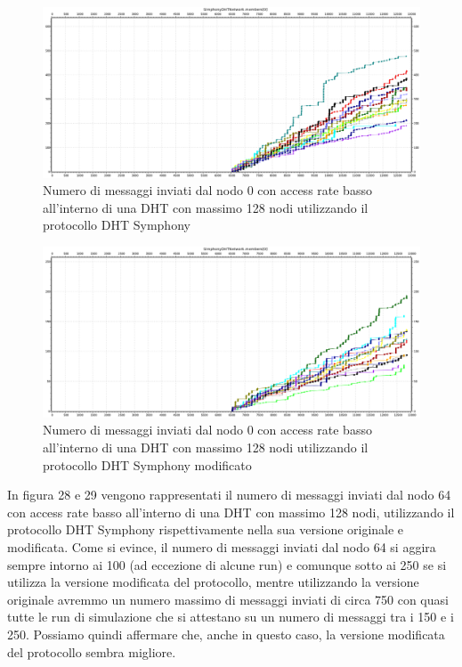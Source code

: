 \documentclass[	
	DIV=calc,
	paper=a4,
	fontsize=11pt,
	onecolumn
]{scrartcl} %
\begin{document}
	\begin{figure}[H]
		\centering
		\includegraphics[scale=0.35]	{SymphonyDHT/plots/MessagesSentByEveryNode/128_Nodes_SlowAccess/SymphonyDHT_128Nodes_SlowAccess_Node0.png}
		\caption{Numero di messaggi inviati dal nodo 0 con access rate basso all'interno di una DHT con massimo 128 nodi utilizzando il protocollo DHT Symphony}
		\label{Figura 26}
	\end{figure}
	\begin{figure}[H]
		\centering
		\includegraphics[scale=0.35]	{SymphonyDHTMod/plots/MessagesSentByEveryNode/128_Nodes_SlowAccess/SymphonyDHTMod_128Nodes_SlowAccess_Node0.png}
		\caption{Numero di messaggi inviati dal nodo 0 con access rate basso all'interno di una DHT con massimo 128 nodi utilizzando il protocollo DHT Symphony modificato}
		\label{Figura 27}
	\end{figure}
	
	In figura 28 e 29 vengono rappresentati il numero di messaggi inviati dal nodo 64 con access rate basso all'interno di una DHT con massimo 128 nodi, utilizzando il protocollo DHT Symphony rispettivamente nella sua versione originale e modificata. Come si evince, il numero di messaggi inviati dal nodo 64 si aggira sempre intorno ai 100 (ad eccezione di alcune run) e comunque sotto ai 250 se si utilizza la versione modificata del protocollo, mentre utilizzando la versione originale avremmo un numero massimo di messaggi inviati di circa 750 con quasi tutte le run di simulazione che si attestano su un numero di messaggi tra i 150 e i 250. Possiamo quindi affermare che, anche in questo caso, la versione modificata del protocollo sembra migliore.
	
\end{document}
